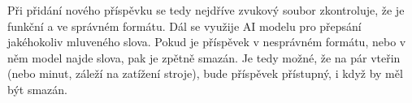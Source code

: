 Při přidání nového příspěvku se tedy nejdříve zvukový soubor zkontroluje, že je funkční a ve správném formátu.
Dál se využije AI modelu pro přepsání jakéhokoliv mluveného slova. Pokud je příspěvek v nesprávném formátu, nebo
v něm model najde slova, pak je zpětně smazán. Je tedy možné, že na pár vteřin (nebo minut, záleží na zatížení stroje),
bude příspěvek přístupný, i když by měl být smazán.
